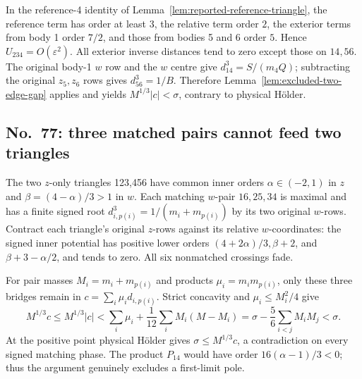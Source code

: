 \documentclass[11pt]{amsart}
\theoremstyle{remark}
\begin{document}
In the reference-4 identity of Lemma~\ref{lem:reported-reference-triangle}, the reference term has order at least $3$, the relative term order $2$, the exterior terms from body 1 order $7/2$, and those from bodies 5 and 6 order $5$. Hence $U_{234}=O(\varepsilon^2)$. All exterior inverse distances tend to zero except those on $14,56$. The original body-1 $w$ row and the $w$ centre give $d_{14}^3=S/(m_4Q)$; subtracting the original $z_5,z_6$ rows gives $d_{56}^3=1/B$. Therefore Lemma~\ref{lem:excluded-two-edge-gap} applies and yields $M^{1/3}|c|<\sigma$, contrary to physical H\"older.

\subsection{No.~77: three matched pairs cannot feed two triangles}\label{sec:no77-matching}
The two $z$-only triangles 123,456 have common inner orders $\alpha\in(-2,1)$ in $z$ and $\beta=(4-\alpha)/3>1$ in $w$. Each matching $w$-pair $16,25,34$ is maximal and has a finite signed root $d_{i,p(i)}^3=1/(m_i+m_{p(i)})$ by its two original $w$-rows. Contract each triangle's original $z$-rows against its relative $w$-coordinates: the signed inner potential has positive lower orders $(4+2\alpha)/3,\beta+2$, and $\beta+3-\alpha/2$, and tends to zero. All six nonmatched crossings fade.

For pair masses $M_i=m_i+m_{p(i)}$ and products $\mu_i=m_im_{p(i)}$, only these three bridges remain in $c=\sum_i\mu_id_{i,p(i)}$. Strict concavity and $\mu_i\le M_i^2/4$ give
\begin{equation}\label{eq:no77-matching-gap}
M^{1/3}c\le M^{1/3}|c|<\sum_i\mu_i+\frac1{12}\sum_i M_i(M-M_i)=\sigma-\frac56\sum_{i<j}M_iM_j<\sigma.
\end{equation}
At the positive point physical H\"older gives $\sigma\le M^{1/3}c$, a contradiction on every signed matching phase. The product $P_{14}$ would have order $16(\alpha-1)/3<0$; thus the argument genuinely excludes a first-limit pole.
\end{document}
